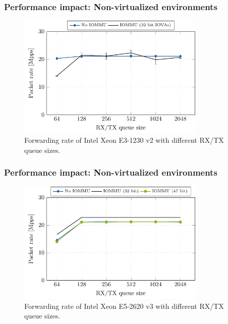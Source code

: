 \begin{frame}
    \frametitle{Performance impact: Non-virtualized environments}

    \begin{figure}
        \centering
        \includegraphics[width=0.8\textwidth,clip]{figures/queue-33.pdf}
        \caption{Forwarding rate of Intel Xeon E3-1230 v2 with different RX/TX
        queue sizes.}
    \end{figure}
\end{frame}

\begin{frame}
    \frametitle{Performance impact: Non-virtualized environments}

    \begin{figure}
        \centering
        \includegraphics[width=0.8\textwidth,clip]{figures/queue-24.pdf}
        \caption{Forwarding rate of Intel Xeon E5-2620 v3 with different RX/TX
        queue sizes.}
    \end{figure}
\end{frame}

